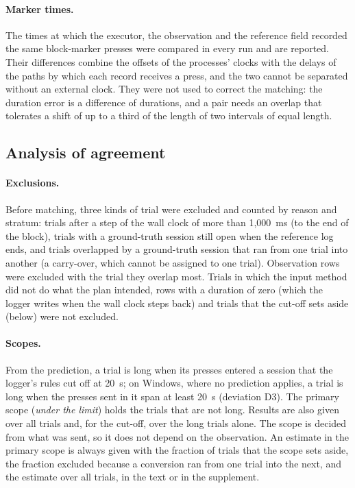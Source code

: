 \paragraph{Marker times.} The times at which the executor, the observation and the reference field recorded the
same block-marker presses were compared in every run and are reported. Their differences combine the offsets of the
processes' clocks with the delays of the paths by which each record receives a press, and the two cannot be separated
without an external clock. They were not used to correct the matching: the duration
error is a difference of durations, and a pair needs an overlap that tolerates a shift of up to a third of the length
of two intervals of equal length.

\subsection{Analysis of agreement}
\label{sec:method-analysis}

\paragraph{Exclusions.} Before matching, three kinds of trial were excluded and counted by reason and stratum: trials
after a step of the wall clock of more than 1{,}000~ms (to the end of the block), trials with a ground-truth session
still open when the reference log ends, and trials overlapped by a ground-truth session that ran from one trial into
another (a carry-over, which cannot be assigned to one trial). Observation rows were excluded with the trial they
overlap most. Trials in which the input method did not do what the plan intended, rows with a duration of zero (which
the logger writes when the wall clock steps back) and trials that the cut-off sets aside (below) were not excluded.

\paragraph{Scopes.} From the prediction, a trial is long when its presses entered a session that the logger's rules cut
off at 20~s; on Windows, where no prediction applies, a trial is long when the presses sent in it span at least 20~s
(deviation D3). The primary scope (\emph{under the limit}) holds the trials that are not long. Results are also given
over all trials and, for the cut-off, over the long trials alone. The scope is decided from what was sent, so it does
not depend on the observation. An estimate in the primary scope is always given with the fraction of trials that the
scope sets aside, the fraction excluded because a conversion ran from one trial into the next, and the estimate over
all trials, in the text or in the supplement.

